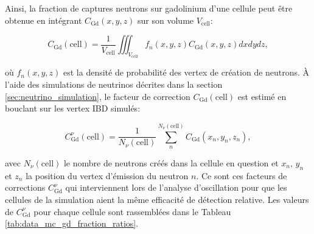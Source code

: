  Ainsi, la fraction de captures neutrons sur gadolinium d'une cellule peut être obtenue en intégrant $C_\textrm{Gd}(x,y,z)$ sur son volume $V_\textrm{cell}$:

\begin{equation}
    C_\textrm{Gd}(\textrm{cell}) = \frac{1}{V_\textrm{cell}} \iiint_{V_\textrm{cell}} f_n(x,y,z) C_\textrm{Gd}(x,y,z)dxdydz,
\end{equation}

\bigbreak

où $f_n(x,y,z)$ est la densité de probabilité des vertex de création de neutrons. À l'aide des simulations de neutrinos décrites dans la section \ref{sec:neutrino_simulation}, le facteur de correction $C_\textrm{Gd}(\textrm{cell})$ est estimé en bouclant sur les vertex IBD simulés:

\begin{equation}
    C_\textrm{Gd}^\nu(\textrm{cell}) = \frac{1}{N_\nu(\textrm{cell})} \sum_n^{N_\nu(\textrm{cell})} C_\textrm{Gd}(x_n,y_n,z_n),
\end{equation}

\bigbreak

avec $N_\nu(\textrm{cell})$ le nombre de neutrons créés dans la cellule en question et $x_n$, $y_n$ et $z_n$ la position du vertex d'émission du neutron $n$. Ce sont ces facteurs de corrections $C_\textrm{Gd}^\nu$ qui interviennent lors de l'analyse d'oscillation pour que les cellules de la simulation aient la même efficacité de détection relative. Les valeurs de $C_\textrm{Gd}^\nu$ pour chaque cellule sont rassemblées dans le Tableau \ref{tab:data_mc_gd_fraction_ratios}.\\


